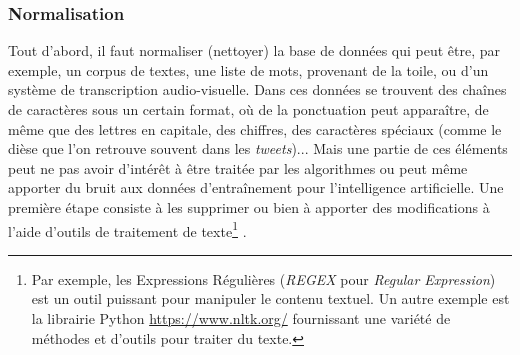 \documentclass[12pt, twoside]{report}
\begin{document}
\subsubsection{Normalisation}
Tout d'abord, il faut normaliser (nettoyer) la base de données qui peut être, par exemple, un corpus de textes, une liste de mots, provenant de la toile, ou d'un système de transcription audio-visuelle. Dans ces données se trouvent des chaînes de caractères sous un certain format, où de la ponctuation peut apparaître, de même que des lettres en capitale, des chiffres, des caractères spéciaux (comme le dièse que l'on retrouve souvent dans les \textit{tweets})... Mais une partie de ces éléments peut ne pas avoir d'intérêt à être traitée par les algorithmes ou peut même apporter du bruit aux données d'entraînement pour l'intelligence artificielle. Une première étape consiste à les supprimer ou bien à apporter des modifications à l'aide d'outils de traitement de texte\footnote{Par exemple, les Expressions Régulières (\textit{REGEX} pour \textit{Regular Expression}) est un outil puissant pour manipuler le contenu textuel. Un autre exemple est la librairie Python \url{https://www.nltk.org/} fournissant une variété de méthodes et d'outils pour traiter du texte.} \autocite[chap.~2]{jurafsky}.\\
\end{document}
